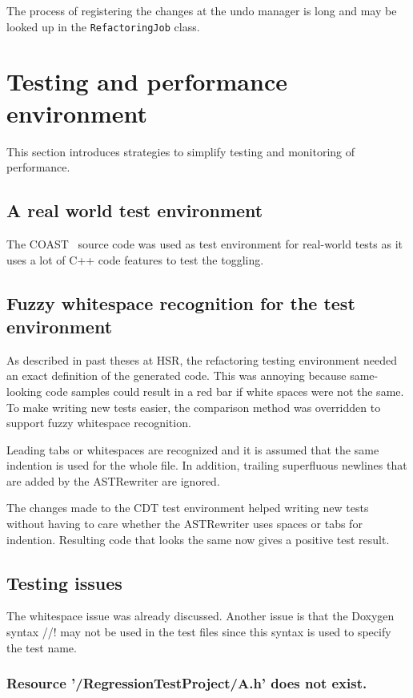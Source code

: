 The process of registering the changes at the undo manager is long and may be 
looked up in the \texttt{RefactoringJob} class.


\section{Testing and performance environment}

This section introduces strategies to simplify testing and monitoring of 
performance.

\subsection{A real world test environment}
The COAST~\cite{COAST} source code was used as test environment for real-world 
tests as it uses a lot of C++ code features to test the toggling.

\subsection[Fuzzy whitespace recognition for the tests]{Fuzzy whitespace 
recognition for the test environment}

As described in past theses at HSR, the refactoring testing environment
needed an exact definition of the generated code. This was annoying because
same-looking code samples could result in a red bar if white spaces were not the
same. To make writing new tests easier, the comparison method was overridden to
support fuzzy whitespace recognition.

Leading tabs or whitespaces are recognized and it is assumed that the same
indention is used for the whole file. In addition, trailing superfluous newlines
that are
added by the ASTRewriter are ignored.

The changes made to the CDT test environment helped writing new tests without
having to care whether the ASTRewriter uses spaces or tabs for indention.
Resulting code that looks the same now gives a positive test result.

\subsection{Testing issues}

The whitespace issue was already discussed. Another issue is that the Doxygen 
syntax //! may not be used in the test files since this syntax is used to 
specify the test name.

\subsubsection{Resource '/RegressionTestProject/A.h' does not exist.}

